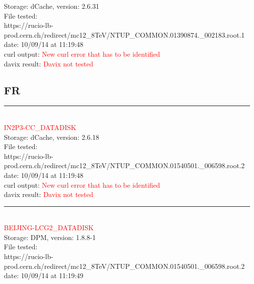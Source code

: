 Storage: dCache, version: 2.6.31\\

File tested:\\
\footnotesize{https://rucio-lb-prod.cern.ch/redirect/mc12\_8TeV/NTUP\_COMMON.01390874.\_002183.root.1}\\

date: 10/09/14 at 11:19:48\\

curl output:  \textcolor{red}{New curl error that has to be identified}\\

davix result:  \textcolor{red}{Davix not tested}\\

\subsection{FR}

\rule{\textwidth}{1pt}\\

\textcolor{red}{\normalsize{IN2P3-CC\_DATADISK}}\\

Storage: dCache, version: 2.6.18\\

File tested:\\
\footnotesize{https://rucio-lb-prod.cern.ch/redirect/mc12\_8TeV/NTUP\_COMMON.01540501.\_006598.root.2}\\

date: 10/09/14 at 11:19:48\\

curl output:  \textcolor{red}{New curl error that has to be identified}\\

davix result:  \textcolor{red}{Davix not tested}\\

\rule{\textwidth}{1pt}\\

\textcolor{red}{\normalsize{BEIJING-LCG2\_DATADISK}}\\

Storage: DPM, version: 1.8.8-1\\

File tested:\\
\footnotesize{https://rucio-lb-prod.cern.ch/redirect/mc12\_8TeV/NTUP\_COMMON.01540501.\_006598.root.2}\\

date: 10/09/14 at 11:19:49\\

